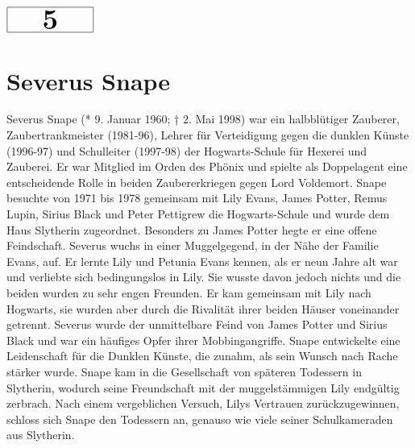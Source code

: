 \documentclass[a4paper, 10pt]{article}
\begin{document}
\begin{minipage}[t]{\textwidth}
    \vspace*{-1.5cm} %
    \begin{flushright}
        \hspace*{\fill} %
        $\boxed{\textbf{\Huge\phantom{00}5\phantom{00}}}$ %
    \end{flushright}
\end{minipage}

\section*{\huge Severus Snape}
Severus Snape (* 9. Januar 1960; † 2. Mai 1998) war ein halbblütiger Zauberer, Zaubertrankmeister (1981-96), Lehrer für Verteidigung gegen die dunklen Künste (1996-97) und Schulleiter (1997-98) der Hogwarts-Schule für Hexerei und Zauberei. Er war Mitglied im Orden des Phönix und spielte als Doppelagent eine entscheidende Rolle in beiden Zaubererkriegen gegen Lord Voldemort.
\vspace{10pt}
\newline
{}  
Snape besuchte von 1971 bis 1978 gemeinsam mit Lily Evans, James Potter, Remus Lupin, Sirius Black und Peter Pettigrew die Hogwarts-Schule und wurde dem Haus Slytherin zugeordnet. Besonders zu James Potter hegte er eine offene Feindschaft.
\vspace{10pt}
\newline
{}  
Severus wuchs in einer Muggelgegend, in der Nähe der Familie Evans, auf. Er lernte Lily und Petunia Evans kennen, als er neun Jahre alt war und verliebte sich bedingungslos in Lily. Sie wusste davon jedoch nichts und die beiden wurden zu sehr engen Freunden. Er kam gemeinsam mit Lily nach Hogwarts, sie wurden aber durch die Rivalität ihrer beiden Häuser voneinander getrennt. Severus wurde der unmittelbare Feind von James Potter und Sirius Black und war ein häufiges Opfer ihrer Mobbingangriffe. Snape entwickelte eine Leidenschaft für die Dunklen Künste, die zunahm, als sein Wunsch nach Rache stärker wurde. Snape kam in die Gesellschaft von späteren Todessern in Slytherin, wodurch seine Freundschaft mit der muggelstämmigen Lily endgültig zerbrach. Nach einem vergeblichen Versuch, Lilys Vertrauen zurückzugewinnen, schloss sich Snape den Todessern an, genauso wie viele seiner Schulkameraden aus Slytherin.
\vspace{10pt}
\end{document}
